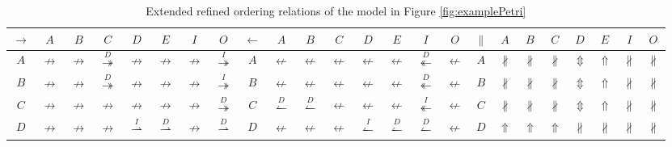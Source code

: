 \documentclass{llncs}
\begin{document}
\begin{table}[htbp]
\centering
\caption{Extended refined ordering relations of the model in Figure \ref{fig:examplePetri}\label{tab:example_relations}}
\begin{tabular}{|c|c|c|c|c|c|c|c!{\vrule width 1.5pt}c|c|c|c|c|c|c|c!{\vrule width 1.5pt}c|c|c|c|c|c|c|c|} \hline
	$\rightarrow$ & $A$ & $B$ & $C$ & $D$ & $E$ & $I$ & $O$ & 
	$\leftarrow$ & $A$ & $B$ & $C$ & $D$ & $E$ & $I$ & $O$ & 
	$\parallel$ & $A$ & $B$ & $C$ & $D$ & $E$ & $I$ & $O$\\ \hline
	
	$A$ & $\nrightarrow$ & $\nrightarrow$ & $\overset{D}{\twoheadrightarrow}$ & $\nrightarrow$ & $\nrightarrow$ & $\nrightarrow$ & $\overset{I}{\twoheadrightarrow}$ &
	$A$ & $\nleftarrow$ & $\nleftarrow$ & $\nleftarrow$ & $\nleftarrow$ & $\nleftarrow$ & $\overset{D}{\twoheadleftarrow}$ & $\nleftarrow$ &
	$A$ & $\nparallel$ & $\nparallel$ & $\nparallel$ & $\Updownarrow$ & $\Uparrow$ & $\nparallel$ & $\nparallel$\\ \hline

	$B$ & $\nrightarrow$ & $\nrightarrow$ & $\overset{D}{\twoheadrightarrow}$ & $\nrightarrow$ & $\nrightarrow$ & $\nrightarrow$ & $\overset{I}{\twoheadrightarrow}$ &
	$B$ & $\nleftarrow$ & $\nleftarrow$ & $\nleftarrow$ & $\nleftarrow$ & $\nleftarrow$ & $\overset{D}{\twoheadleftarrow}$ & $\nleftarrow$ &
	$B$ & $\nparallel$ & $\nparallel$ & $\nparallel$ & $\Updownarrow$ & $\Uparrow$ & $\nparallel$ & $\nparallel$\\ \hline

	$C$ & $\nrightarrow$ & $\nrightarrow$ & $\nrightarrow$ & $\nrightarrow$ & $\nrightarrow$ & $\nrightarrow$ & $\overset{D}{\twoheadrightarrow}$ &
	$C$ & $\overset{D}{\leftharpoonup}$ & $\overset{D}{\leftharpoonup}$ & $\nleftarrow$ & $\nleftarrow$ & $\nleftarrow$ & $\overset{I}{\twoheadleftarrow}$ & $\nleftarrow$ &
	$C$ & $\nparallel$ & $\nparallel$ & $\nparallel$ & $\Updownarrow$ & $\Uparrow$ & $\nparallel$ & $\nparallel$\\ \hline

	$D$ & $\nrightarrow$ & $\nrightarrow$ & $\nrightarrow$ & $\overset{I}{\rightharpoonup}$ & $\overset{D}{\rightharpoonup}$ & $\nrightarrow$ & $\overset{D}{\rightharpoonup}$ &
	$D$ & $\nleftarrow$ & $\nleftarrow$ & $\nleftarrow$ & $\overset{I}{\leftharpoonup}$ & $\overset{D}{\leftharpoonup}$ & $\overset{D}{\leftharpoonup}$ & $\nleftarrow$ &
	$D$ & $\Uparrow$ & $\Uparrow$ & $\Uparrow$ & $\nparallel$ & $\nparallel$ & $\nparallel$ & $\nparallel$\\ \hline


\end{tabular}
\end{table}
\end{document}
